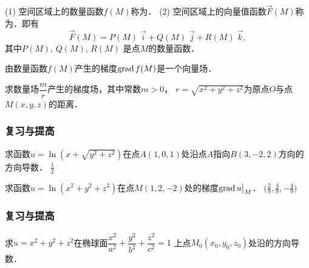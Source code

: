 \documentclass[14pt,notheorems,leqno,xcolor={rgb}]{beamer} %
\begin{document}
\begin{frame}
\begin{definition}
(1) 空间区域上的数量函数$f(M)$称为．\ppause
(2) 空间区域上的向量值函数$\vec{F}(M)$称为．即有
\[ \vec{F}(M) = P(M)\;\vec{i} + Q(M)\;\vec{j} + R(M)\;\vec{k}, \]
其中$P(M)$, $Q(M)$, $R(M)$ 是点$M$的数量函数．
\end{definition}
\vpause
\begin{remark*}
由数量函数$f(M)$产生的梯度$\operatorname{grad} f(M)$是一个向量场．
\end{remark*}
\vpause
\begin{example}
求数量场$\dfrac{m}{r}$产生的梯度场，其中常数$m>0$，
$r=\sqrt{x^2+y^2+z^2}$为原点$O$与点$M(x,y,z)$的距离．
\end{example}
\end{frame}


\begin{frame}
\frametitle{复习与提高}
\begin{puzzle}%
求函数$u=\ln(x+\sqrt{y^2+z^2})$在点$A(1,0,1)$处沿点$A$指向$B(3,-2,2)$方向的方向导数．
\pause\cdotfill$\frac12$
\end{puzzle}
\vpause
\begin{puzzle}%
求函数$u=\ln(x^2+y^2+z^2)$在点$M(1,2,-2)$处的梯度$\operatorname{grad} u\big|_M$．
\pause\cdotfill$\big(\frac{2}{9},\frac{4}{9},-\frac{4}{9}\big)$
\end{puzzle}
\end{frame}

\begin{frame}
\frametitle{复习与提高}
\begin{puzzle}%
求$u=x^2+y^2+z^2$在椭球面$\dfrac{x^2}{a^2}+\dfrac{y^2}{b^2}+\dfrac{z^2}{c^2}=1$
上点$M_0(x_0,y_0,z_0)$处沿的方向导数．
\end{puzzle}
\end{frame}
\end{document}
